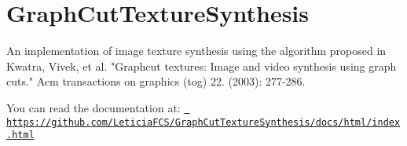 \chapter{Graph\+Cut\+Texture\+Synthesis}
\hypertarget{index}{}\label{index}
\label{index_md__2home_2leticiafcs_2tcc_2GraphCutTextureSynthesis_2README}%
%
An implementation of image texture synthesis using the algorithm proposed in \textquotesingle{}Kwatra, Vivek, et al. "{}\+Graphcut textures\+: Image and video synthesis using graph cuts."{} Acm transactions on graphics (tog) 22. (2003)\+: 277-\/286.\textquotesingle{}

You can read the documentation at\+: \href{https://github.com/LeticiaFCS/GraphCutTextureSynthesis/docs/html/index.html}{\texttt{ https\+://github.\+com/\+Leticia\+FCS/\+Graph\+Cut\+Texture\+Synthesis/docs/html/index.\+html}} 